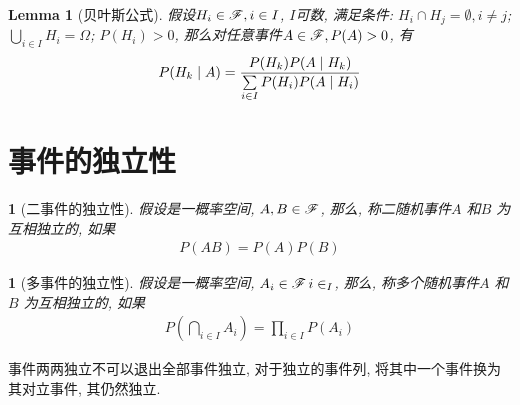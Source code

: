 \newtheorem{bayes_formula}[theorem_root]{Lemma}
\begin{bayes_formula}[贝叶斯公式]
    假设\(H_i\in\msF, i\in I\), \(I\)可数, 满足条件:
    \(H_i \cap H_j = \emptyset, i\ne j\); \(\bigcup\limits_{i\in I} H_i = \Omega\);
    \(P(H_i) > 0\), 那么对任意事件\(A\in\msF, P(A) > 0\), 有
    \begin{align}
        P(H_k\mid A) = {P(H_k)P(A\mid H_k)\over \sum\limits_{i\in I}P(H_i)P(A\mid H_i)}
    \end{align}
\end{bayes_formula}


\section{事件的独立性}

\newtheorem{independence_of_event}[theorem_root]{}
\begin{independence_of_event}[二事件的独立性]
    假设\prbsp 是一概率空间, \(A, B\in\msF\), 那么, 称二随机事件\(A\) 和\(B\) 为互相独立的, 如果
    \begin{align}
        P(AB) = P(A)P(B)
    \end{align}
\end{independence_of_event}

\newtheorem{independence_of_multiple_event}[theorem_root]{}
\begin{independence_of_multiple_event}[多事件的独立性]
    假设\prbsp 是一概率空间, \(A_i\in\msF\, i\in_{I}\), 那么, 称多个随机事件\(A\) 和\(B\) 为互相独立的, 如果
    \begin{align}
        P(\bigcap\limits_{i\in I} A_i) = \prod\limits_{i\in I}P(A_i)
    \end{align}
\end{independence_of_multiple_event}

事件两两独立不可以退出全部事件独立, 对于独立的事件列, 将其中一个事件换为其对立事件, 
其仍然独立.

